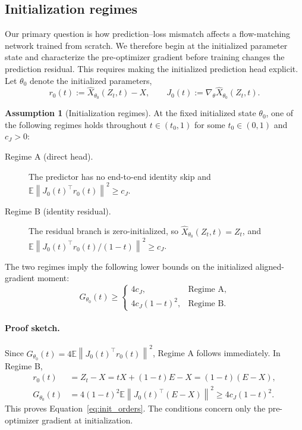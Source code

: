 \documentclass{article}
\theoremstyle{plain}
\theoremstyle{definition}
\newtheorem{assumption}[theorem]{Assumption}
\theoremstyle{remark}
\newcommand{\Ex}{\mathbb{E}}
\newcommand{\norm}[1]{\left\lVert #1\right\rVert}
\begin{document}
\subsection{Initialization regimes}

Our primary question is how prediction--loss mismatch affects a flow-matching network trained from scratch. We therefore begin at the initialized parameter state and characterize the pre-optimizer gradient before training changes the prediction residual. This requires making the initialized prediction head explicit. Let $\theta_0$ denote the initialized parameters,
\begin{equation}
r_0(t):=\hat X_{\theta_0}(Z_t,t)-X,
\qquad
J_0(t):=\nabla_\theta\hat X_{\theta_0}(Z_t,t).
\label{eq:init_objects}
\end{equation}

\begin{assumption}[Initialization regimes]
\label{ass:init_regimes}
At the fixed initialized state $\theta_0$, one of the following regimes holds throughout $t\in(t_0,1)$ for some $t_0\in(0,1)$ and $c_J>0$:
\begin{description}
    \item[Regime A (direct head).] The predictor has no end-to-end identity skip and
    $\Ex\norm{J_0(t)^\top r_0(t)}^2\ge c_J$.
    \item[Regime B (identity residual).] The residual branch is zero-initialized, so
    $\hat X_{\theta_0}(Z_t,t)=Z_t$, and
    $\Ex\norm{J_0(t)^\top r_0(t)/(1-t)}^2\ge c_J$.
\end{description}
\end{assumption}

The two regimes imply the following lower bounds on the initialized aligned-gradient moment:
\begin{equation}
G_{\theta_0}(t)\ge
\begin{cases}
4c_J, & \text{Regime A},\\
4c_J(1-t)^2, & \text{Regime B}.
\end{cases}
\label{eq:init_orders}
\end{equation}

\paragraph{Proof sketch.}
Since $G_{\theta_0}(t)=4\Ex\norm{J_0(t)^\top r_0(t)}^2$, Regime A follows immediately. In Regime B,
\begin{align}
r_0(t)
&=Z_t-X=tX+(1-t)E-X=(1-t)(E-X),\\
G_{\theta_0}(t)
&=4(1-t)^2\Ex\norm{J_0(t)^\top(E-X)}^2
\ge4c_J(1-t)^2.
\end{align}
This proves Equation~\eqref{eq:init_orders}. The conditions concern only the pre-optimizer gradient at initialization.
\end{document}
